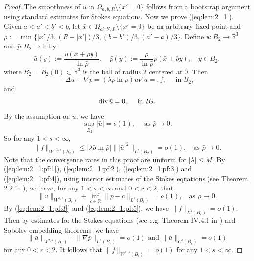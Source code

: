 \documentclass[12pt]{article}
\newcommand{\dive}{{\rm div \hspace{0.05cm} }}
\begin{document}
\begin{proof}
	The smoothness of $u$ in $\Omega_{a, b, R}\setminus\{x'=0\}$ follows from a bootstrap argument using standard estimates for Stokes equations. Now we prove (\ref{eq:lem:2_1}). Given $a<a'<b'<b$, let $\bar{x} \in \Omega_{a', b', R} \setminus\{x'=0\}$ be an arbitrary fixed point and $\bar{\rho}:=\min\{|\bar{x}'|/3, (R-|\bar{x}'|)/3, (b-b')/3, (a'-a)/3\}$. Define $\bar{u}: B_2\to\mathbb{R}^3$ and $\bar{p}: B_2\to\mathbb{R}$ by 
	\begin{equation*}
		\bar{u}(y) := \frac{u(\bar{x}+\bar{\rho}y)}{\ln \bar{\rho}}, \quad 
		\bar{p}(y) := \frac{\bar{\rho}}{\ln \bar{\rho}}p(\bar{x}+\bar{\rho}y), \quad y\in B_2,
	\end{equation*}
	where $B_2=B_2(0)\subset \mathbb{R}^3$ is the ball of radius $2$ centered at $0$. Then 
	\begin{equation}\label{eq:lem:2_1:pf:1}
		-\Delta \bar{u}+\nabla\bar{p}
		=(\lambda\bar{\rho}\ln \bar{\rho}) \bar{u}\nabla\bar{u}=:f, \quad \textrm{ in } B_2,
	\end{equation}
	and
	\begin{equation}\label{eq:lem:2_1:pf:2}
		\dive \bar{u}=0, \quad \textrm{ in }B_2.
	\end{equation} 
	By the assumption on $u$, we have
	\begin{equation}\label{eq:lem:2_1:pf:3}
		\sup_{B_2}|\bar{u}|=o(1), \quad \textrm{ as }\bar{\rho}\to 0. 
	\end{equation}
	So for any $1<s<\infty$, 
	\begin{equation}\label{eq:lem:2_1:pf:4}
		\| f \|_{W^{-1, s}(B_2)}\le |\lambda \bar{\rho}\ln \bar{\rho}| \| |\bar{u}|^2 \|_{L^s(B_2)}=o(1),
		\quad \textrm{as } \bar{\rho}\to 0. 
	\end{equation}
	Note that the convergence rates in this proof are uniform for $|\lambda|\le M$. 
	By (\ref{eq:lem:2_1:pf:1}), (\ref{eq:lem:2_1:pf:2}), (\ref{eq:lem:2_1:pf:3}) and (\ref{eq:lem:2_1:pf:4}), using interior estimates of the Stokes equations (see Theorem 2.2 in \cite{SverakTsai}), 
	we have, for any $1<s<\infty$ and $0<r<2$, that 
	\begin{equation}\label{eq:lem:2_1:pf:5}
		\| \bar{u} \|_{W^{1, s}(B_r)} + \inf_{c\in\mathbb{R}}\|\bar{p}-c\|_{L^s(B_r)} = o(1), \quad \textrm{as } \bar{\rho}\to 0. 
	\end{equation}
	By (\ref{eq:lem:2_1:pf:3}) and (\ref{eq:lem:2_1:pf:5}), we have $\|f\|_{L^s(B_r)}=o(1)$. Then by estimates for the Stokes equations (see e.g. Theorem IV.4.1 in \cite{Galdi}) and Sobolev embedding theorems, we have 
	\begin{equation}\label{eq:lem:2_1:pf:6}
		\|\bar u\|_{W^{2, s}(B_{r})}+\|\nabla \bar p\|_{L^{s}(B_{r})}=o(1) \textrm{ and } \|\bar{u}\|_{C^1(B_r)}=o(1)
	\end{equation}
	for any $0<r<2$. It follows that $\|f\|_{W^{1, s}(B_r)}=o(1)$ for any $1<s<\infty$. 


\end{proof}
\end{document}

